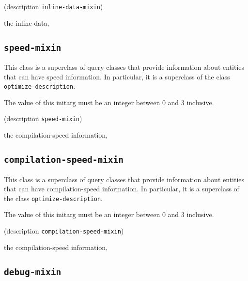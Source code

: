 {\footnotesize
{} {(description {\tt inline-data-mixin})}
}

 the inline data, 

\subsection{\texttt{speed-mixin}}
\label{sec-speed-mixin}

{\footnotesize
{}
}

This class is a superclass of query classes that provide information
about entities that can have speed information.  In particular, it is a
superclass of the class \texttt{optimize-description}.

{\footnotesize
{}
}

The value of this initarg must be an integer between $0$ and $3$
inclusive.

{\footnotesize
{} {(description {\tt speed-mixin})}
}

 the compilation-speed information, 

\subsection{\texttt{compilation-speed-mixin}}
\label{sec-compilation-speed-mixin}

{\footnotesize
{}
}

This class is a superclass of query classes that provide information
about entities that can have compilation-speed information.  In particular, it is a
superclass of the class \texttt{optimize-description}.

{\footnotesize
{}
}

The value of this initarg must be an integer between $0$ and $3$
inclusive.

{\footnotesize
{} {(description {\tt compilation-speed-mixin})}
}

 the compilation-speed information, 

\subsection{\texttt{debug-mixin}}
\label{sec-debug-mixin}

